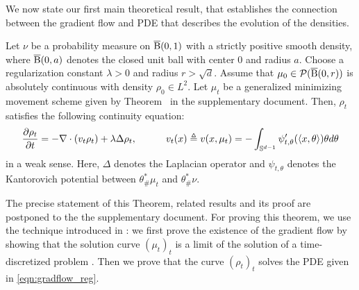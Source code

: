We now state our first main theoretical result, that establishes the connection between the gradient flow and PDE that describes the evolution of the densities.
\begin{thm}
\label{thm:continuity}
Let $\nu$ be a probability measure on $\operatorname{\overline{B}}(0,1)$ with a strictly positive smooth density, where $\operatorname{\overline{B}}(0,a)$ denotes the closed unit ball with center $0$ and radius $a$. Choose a regularization constant $\lambda > 0$ and radius $r > \sqrt{d}$. Assume that $\mu_0 \in \mathcal{P}(\operatorname{\overline{B}}(0,r))$ is absolutely continuous with density $\rho_0 \in L^2$. Let $\mu_t$ be a generalized minimizing movement scheme given by Theorem~ in the supplementary document. Then, $\rho_t$ satisfies the following continuity equation:
\begin{align}
\frac{\partial \rho_t}{\partial t}   = -\nabla \cdot (v_t \rho_t) + \lambda \Delta \rho_t,  \quad \quad \quad v_t(x) \triangleq v(x,\mu_t) = - \int_{\mathbb{S}^{d-1}} \psi_{t, \theta}'(\langle x , \theta \rangle ) \theta d\theta  \label{eqn:gradflow_reg}
\end{align}
in a weak sense. Here, $\Delta$ denotes the Laplacian operator and $\psi_{t,\theta}$ denotes the Kantorovich potential between $\theta^*_{\#}\mu_t$ and $\theta^*_{\#}\nu$.
\end{thm}
The precise statement of this Theorem, related results and its proof are postponed to the the supplementary document. For proving this theorem, we use the technique introduced in \cite{bonnotte2013unidimensional}: we first prove the existence of the gradient flow by showing that the solution curve $(\mu_t)_t$ is a limit of the solution of a time-discretized problem \cite{jordan1998variational}. Then we prove that the curve $(\rho_t)_t$ solves the PDE given in \eqref{eqn:gradflow_reg}.





